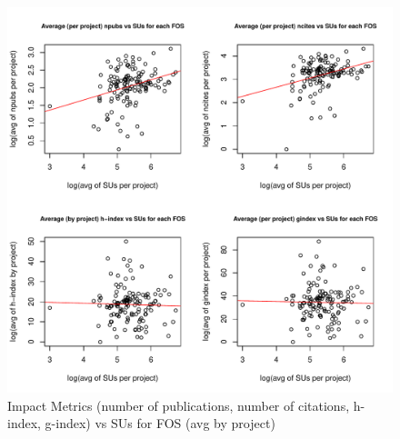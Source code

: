 \documentclass{sig-alternate}
\begin{document}
\begin{figure}[!htb] 
  \centering 
    \includegraphics[width=1.0\columnwidth]{images/08_metrics_vs_alloc_avg_log_fit.pdf} 
  \caption{Impact Metrics (number of publications, number of citations, h-index, g-index) vs SUs for FOS (avg by project)}\label{F:metrics-vs-alloc-avg-log-fit} 
\end{figure} 
 
\end{document}

